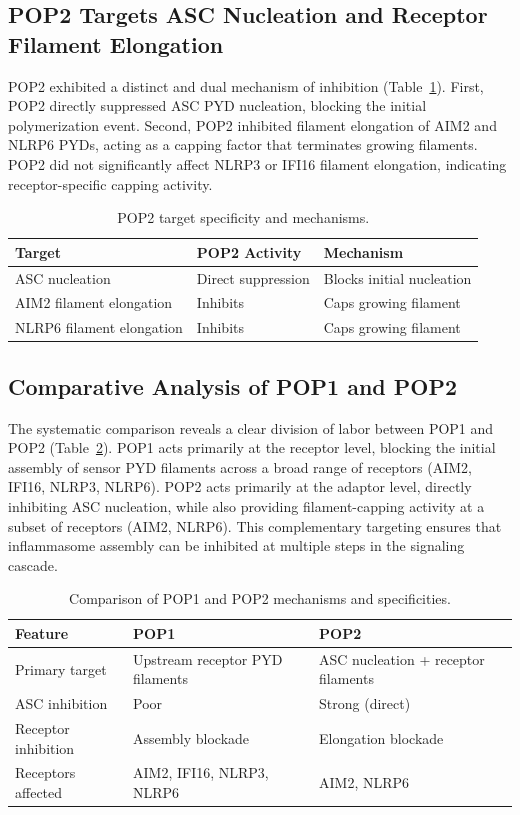 \documentclass[11pt]{article}
\begin{document}
\subsection{POP2 Targets ASC Nucleation and Receptor Filament Elongation}

POP2 exhibited a distinct and dual mechanism of inhibition (Table~\ref{tab:pop2}). First, POP2 directly suppressed ASC PYD nucleation, blocking the initial polymerization event. Second, POP2 inhibited filament elongation of AIM2 and NLRP6 PYDs, acting as a capping factor that terminates growing filaments. POP2 did not significantly affect NLRP3 or IFI16 filament elongation, indicating receptor-specific capping activity.

\begin{table}[ht]
\centering
\caption{POP2 target specificity and mechanisms.}
\label{tab:pop2}
\begin{tabular}{lll}
\toprule
\textbf{Target} & \textbf{POP2 Activity} & \textbf{Mechanism} \\
\midrule
ASC nucleation & Direct suppression & Blocks initial nucleation \\
AIM2 filament elongation & Inhibits & Caps growing filament \\
NLRP6 filament elongation & Inhibits & Caps growing filament \\
\bottomrule
\end{tabular}
\end{table}

\subsection{Comparative Analysis of POP1 and POP2}

The systematic comparison reveals a clear division of labor between POP1 and POP2 (Table~\ref{tab:comparison}). POP1 acts primarily at the receptor level, blocking the initial assembly of sensor PYD filaments across a broad range of receptors (AIM2, IFI16, NLRP3, NLRP6). POP2 acts primarily at the adaptor level, directly inhibiting ASC nucleation, while also providing filament-capping activity at a subset of receptors (AIM2, NLRP6). This complementary targeting ensures that inflammasome assembly can be inhibited at multiple steps in the signaling cascade.

\begin{table}[ht]
\centering
\caption{Comparison of POP1 and POP2 mechanisms and specificities.}
\label{tab:comparison}
\begin{tabular}{lll}
\toprule
\textbf{Feature} & \textbf{POP1} & \textbf{POP2} \\
\midrule
Primary target & Upstream receptor PYD filaments & ASC nucleation + receptor filaments \\
ASC inhibition & Poor & Strong (direct) \\
Receptor inhibition & Assembly blockade & Elongation blockade \\
Receptors affected & AIM2, IFI16, NLRP3, NLRP6 & AIM2, NLRP6 \\
\bottomrule
\end{tabular}
\end{table}
\end{document}
